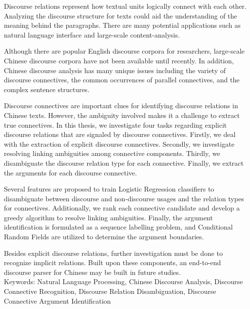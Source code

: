 \begin{abstracten}

Discourse relations represent how textual units logically connect
with each other. Analyzing the discourse structure for texts
could aid the understanding of the meaning behind the paragraphs.
There are many potential applications such as natural language
interface and large-scale content-analysis.

Although there are popular English discourse corpora for researchers,
large-scale Chinese discourse corpora have not been available until
recently. In addition, Chinese discourse analysis has many
unique issues including the variety of discourse connectives,
the common occurrences of parallel connectives, and the complex
sentence structures.

Discourse connectives are important clues for identifying discourse
relations in Chinese texts. However, the ambiguity involved makes
it a challenge to extract true connectives. In this thesis, we investigate
four tasks regarding explicit discourse relations that are signaled
by discourse connectives. Firstly, we deal with the extraction
of explicit discourse connectives. Secondly, we investigate resolving
linking ambiguities among connective components.
Thirdly, we disambiguate the discourse relation type for each connective.
Finally, we extract the arguments for each discourse connective.

Several features are proposed to train Logistic Regression classifiers
to disambiguate between discourse and non-discourse usages and
the relation types for connectives. Additionally, we rank each
connective candidate and develop a greedy algorithm to resolve
linking ambiguities. Finally, the argument identification is formulated
as a sequence labelling problem, and Conditional Random Fields are
utilized to determine the argument boundaries.

Besides explicit discourse relations, further investigation must be done
to recognize implicit relations. Built upon these components,
an end-to-end discourse parser for Chinese may be built in future studies. \\

\noindent
Keywords: Natural Language Processing, Chinese Discourse Analysis,
Discourse Connective Recognition, Discourse Relation Disambiguation,
Discourse Connective Argument Identification
\end{abstracten}

